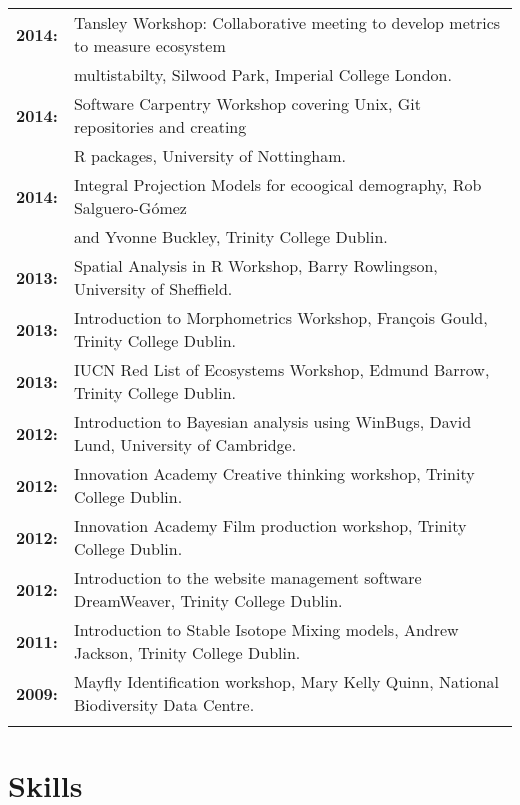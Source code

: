 \documentclass[10pt,a4paper]{article}
\begin{document}
\begin{tabular}{ll}
\textbf{2014:} & Tansley Workshop: Collaborative meeting to develop metrics to measure ecosystem\\
&multistabilty, Silwood Park, Imperial College London.\\
\textbf{2014:} & Software Carpentry Workshop covering Unix, Git repositories and creating\\
&R packages, University of Nottingham.\\
\textbf{2014:} & Integral Projection Models for ecoogical demography, Rob Salguero-Gómez\\
&and Yvonne Buckley, Trinity College Dublin.\\
\textbf{2013:} & Spatial Analysis in R Workshop, Barry Rowlingson, University of Sheffield.\\
\textbf{2013:} & Introduction to Morphometrics Workshop, François Gould, Trinity College Dublin.\\
\textbf{2013:} & IUCN Red List of Ecosystems Workshop, Edmund Barrow, Trinity College Dublin.\\
\textbf{2012:} & Introduction to Bayesian analysis using WinBugs, David Lund, University of Cambridge.\\
\textbf{2012:} & Innovation Academy Creative thinking workshop, Trinity College Dublin.\\
\textbf{2012:} & Innovation Academy Film production workshop, Trinity College Dublin.\\
\textbf{2012:} & Introduction to the website management software DreamWeaver, Trinity College Dublin.\\
\textbf{2011:} & Introduction to Stable Isotope Mixing models, Andrew Jackson, Trinity College Dublin.\\
\textbf{2009:} & Mayfly Identification workshop, Mary Kelly Quinn, National Biodiversity Data Centre.\\
&\\
\end{tabular}

\bigskip
\section{Skills}
\end{document}
